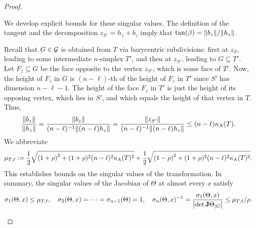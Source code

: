 \documentclass[10pt,a4paper]{article}
\begin{document}
\begin{proof}
\begin{itemize}
        We develop explicit bounds for these singular values. 
        The definition of the tangent and the decomposition $z_{S'} = h_{z} + b_{z}$ 
        imply that $\tan(\beta) = \|  b_{z}  \| / \|  h_{z}  \|$.
        
        Recall that $G \in {\mathcal G}$ is obtained from $T$ via barycentric subdivisions: 
        first at $z_{S}$, leading to some intermediate $n$-simplex $T'$, and then at $z_{S'}$, leading to $G \subseteq T'$. 
        Let $F_{z} \subseteq G$ be the face opposite to the vertex $z_{S'}$, which is some face of $T'$.
        Now, the height of $F_{z}$ in $G$ is $(n-\ell)$-th of the height of $F_{z}$ in $T'$
        since $S'$ has dimension $n-\ell-1$. 
        The height of the face $F_{z}$ in $T'$ is just the height of its opposing vertex, which lies in $S'$,
        and which equals the height of that vertex in $T$.
        Thus, 
        \begin{align*}
            \frac{ \|  b_{z}  \| }{ \|  h_{z}  \| }
            = 
            \frac{ \|  b_{z}  \| }{ (n-\ell)^{-1} \|  (n-\ell) h_{z}  \| }
            = 
            \frac{ \|  z_{S'}  \| }{ (n-\ell)^{-1} \|  (n-\ell) h_{z}  \| }
            \leq 
            (n-\ell) \kappa_{\rm A}(T)
            .
        \end{align*}
        We abbreviate 
        \begin{align}\label{math:upper_bound_for_theta}
            \mu_{T,\ell} 
            := 
            \frac 1 2 \sqrt{ \left( 1 + \rho \right)^{2} + (1+\rho)^{2} (n-\ell)^{2} \kappa_{\rm A}(T)^{2} } 
            + 
            \frac 1 2 \sqrt{ \left( 1 - \rho \right)^{2} + (1+\rho)^{2} (n-\ell)^{2} \kappa_{\rm A}(T)^{2} }
            .
        \end{align}
        This establishes bounds on the singular values of the transformation. 
        In summary, the singular values of the Jacobian of $\Theta$ at almost every $x$ satisfy 
        \begin{align}
            \sigma_{1}(\Theta,x) \leq \mu_{T,\ell},
            \quad 
            \sigma_{2}(\Theta,x) = \dots = \sigma_{n-1}(\Theta) = 1,
            \quad 
            \sigma_{n}(\Theta,x)^{-1} = \frac{ \sigma_{1}(\Theta,x) }{ \left| \det {\mathbf{J}}\Theta_{|G} \right| } \leq \mu_{T,\ell} / \rho.
        \end{align}
        

\end{itemize}
\end{proof}
\end{document}
